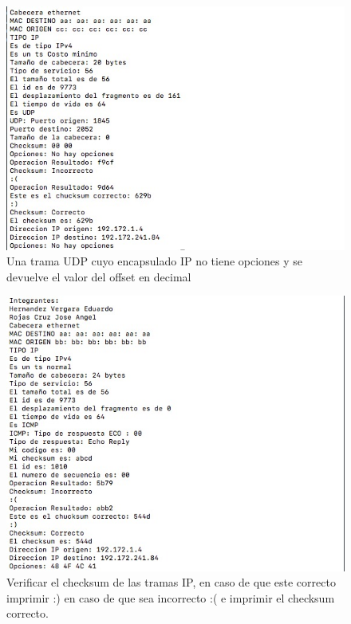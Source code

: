 		\begin{figure}[h]
			\centering		
			\includegraphics[width=\textwidth]{Ejercicio3}
			\caption{Una trama UDP cuyo encapsulado IP no tiene opciones y se devuelve el valor del offset en decimal}
		\end{figure}
		\begin{figure}[h]
			\centering		
			\includegraphics[width=\textwidth]{Ejercicio1}
			\caption{Verificar el checksum de las tramas IP, en caso de que este correcto imprimir :) en caso de que sea incorrecto :( e imprimir el checksum correcto.}
		\end{figure}
	\clearpage

